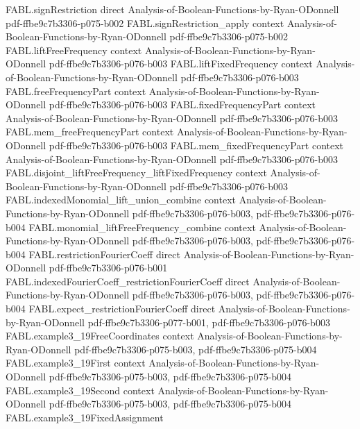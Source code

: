 \begin{theorem}
  {FABL.signRestriction}
  {direct}
  {Analysis-of-Boolean-Functions-by-Ryan-ODonnell}
  {pdf-ffbe9c7b3306-p075-b002}
\proofstep
  {FABL.signRestriction_apply}
  {context}
  {Analysis-of-Boolean-Functions-by-Ryan-ODonnell}
  {pdf-ffbe9c7b3306-p075-b002}
\proofstep
  {FABL.liftFreeFrequency}
  {context}
  {Analysis-of-Boolean-Functions-by-Ryan-ODonnell}
  {pdf-ffbe9c7b3306-p076-b003}
\proofstep
  {FABL.liftFixedFrequency}
  {context}
  {Analysis-of-Boolean-Functions-by-Ryan-ODonnell}
  {pdf-ffbe9c7b3306-p076-b003}
\proofstep
  {FABL.freeFrequencyPart}
  {context}
  {Analysis-of-Boolean-Functions-by-Ryan-ODonnell}
  {pdf-ffbe9c7b3306-p076-b003}
\proofstep
  {FABL.fixedFrequencyPart}
  {context}
  {Analysis-of-Boolean-Functions-by-Ryan-ODonnell}
  {pdf-ffbe9c7b3306-p076-b003}
\proofstep
  {FABL.mem_freeFrequencyPart}
  {context}
  {Analysis-of-Boolean-Functions-by-Ryan-ODonnell}
  {pdf-ffbe9c7b3306-p076-b003}
\proofstep
  {FABL.mem_fixedFrequencyPart}
  {context}
  {Analysis-of-Boolean-Functions-by-Ryan-ODonnell}
  {pdf-ffbe9c7b3306-p076-b003}
\proofstep
  {FABL.disjoint_liftFreeFrequency_liftFixedFrequency}
  {context}
  {Analysis-of-Boolean-Functions-by-Ryan-ODonnell}
  {pdf-ffbe9c7b3306-p076-b003}
\proofstep
  {FABL.indexedMonomial_lift_union_combine}
  {context}
  {Analysis-of-Boolean-Functions-by-Ryan-ODonnell}
  {pdf-ffbe9c7b3306-p076-b003,
    pdf-ffbe9c7b3306-p076-b004}
\proofstep
  {FABL.monomial_liftFreeFrequency_combine}
  {context}
  {Analysis-of-Boolean-Functions-by-Ryan-ODonnell}
  {pdf-ffbe9c7b3306-p076-b003,
    pdf-ffbe9c7b3306-p076-b004}
\proofstep
  {FABL.restrictionFourierCoeff}
  {direct}
  {Analysis-of-Boolean-Functions-by-Ryan-ODonnell}
  {pdf-ffbe9c7b3306-p076-b001}
\proofstep
  {FABL.indexedFourierCoeff_restrictionFourierCoeff}
  {direct}
  {Analysis-of-Boolean-Functions-by-Ryan-ODonnell}
  {pdf-ffbe9c7b3306-p076-b003,
    pdf-ffbe9c7b3306-p076-b004}
\proofstep
  {FABL.expect_restrictionFourierCoeff}
  {direct}
  {Analysis-of-Boolean-Functions-by-Ryan-ODonnell}
  {pdf-ffbe9c7b3306-p077-b001,
    pdf-ffbe9c7b3306-p076-b003}
\proofstep
  {FABL.example3_19FreeCoordinates}
  {context}
  {Analysis-of-Boolean-Functions-by-Ryan-ODonnell}
  {pdf-ffbe9c7b3306-p075-b003,
    pdf-ffbe9c7b3306-p075-b004}
\proofstep
  {FABL.example3_19First}
  {context}
  {Analysis-of-Boolean-Functions-by-Ryan-ODonnell}
  {pdf-ffbe9c7b3306-p075-b003,
    pdf-ffbe9c7b3306-p075-b004}
\proofstep
  {FABL.example3_19Second}
  {context}
  {Analysis-of-Boolean-Functions-by-Ryan-ODonnell}
  {pdf-ffbe9c7b3306-p075-b003,
    pdf-ffbe9c7b3306-p075-b004}
\proofstep
  {FABL.example3_19FixedAssignment}

\end{theorem}

